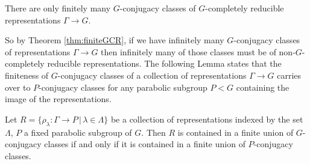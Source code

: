 \begin{theorem} \label{thm:finiteGCR} There are only finitely many $G$-conjugacy classes of $G$-completely reducible representations $\Gamma\rightarrow G$.
\end{theorem}

So by Theorem \ref{thm:finiteGCR}, if we have infinitely many $G$-conjugacy classes of representations $\Gamma\rightarrow G$ then infinitely many of those classes must be of non-$G$-completely reducible representations. The following Lemma states that the finiteness of $G$-conjugacy classes of a collection of representations $\Gamma\rightarrow G$ carries over to $P$-conjugacy classes for any parabolic subgroup $P<G$ containing the image of the representations.

\begin{lemma}\label{GIsPConj} Let $R=\{\rho_\lambda:\Gamma\rightarrow P\, |\, \lambda \in \Lambda\}$ be a collection of representations indexed by the set $\Lambda$, $P$ a fixed parabolic subgroup of $G$. Then $R$ is contained in a finite union of $G$-conjugacy classes if and only if it is contained in a finite union of $P$-conjugacy classes.
\end{lemma}
